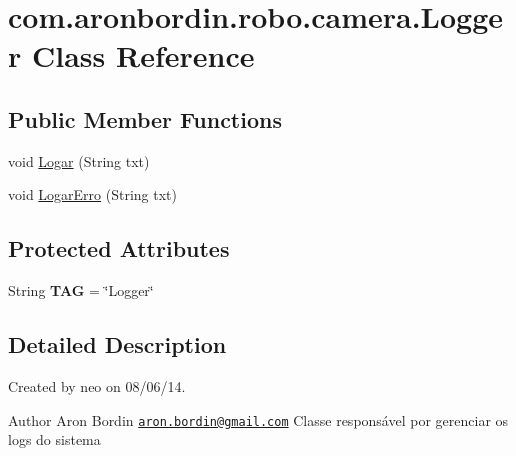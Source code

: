 \hypertarget{classcom_1_1aronbordin_1_1robo_1_1camera_1_1Logger}{\section{com.\+aronbordin.\+robo.\+camera.\+Logger Class Reference}
\label{classcom_1_1aronbordin_1_1robo_1_1camera_1_1Logger}
}
\subsection*{Public Member Functions}
\begin{DoxyCompactItemize}
\item 
void \hyperlink{classcom_1_1aronbordin_1_1robo_1_1camera_1_1Logger_a2eaaf2648c5a95b0ccf221703f4bd97e}{Logar} (String txt)
\item 
void \hyperlink{classcom_1_1aronbordin_1_1robo_1_1camera_1_1Logger_a774dc21499208a63a88b219a76be6e0c}{Logar\+Erro} (String txt)
\end{DoxyCompactItemize}
\subsection*{Protected Attributes}
\begin{DoxyCompactItemize}
\item 
\hypertarget{classcom_1_1aronbordin_1_1robo_1_1camera_1_1Logger_ae1d3ae02ba0a8d6fa91042a5e03bcc4e}{String {\bfseries T\+A\+G} = \char`\"{}Logger\char`\"{}}\label{classcom_1_1aronbordin_1_1robo_1_1camera_1_1Logger_ae1d3ae02ba0a8d6fa91042a5e03bcc4e}

\end{DoxyCompactItemize}


\subsection{Detailed Description}
Created by neo on 08/06/14. \begin{DoxyAuthor}{Author}
Aron Bordin \href{mailto:aron.bordin@gmail.com}{\tt aron.\+bordin@gmail.\+com} Classe responsável por gerenciar os logs do sistema 
\end{DoxyAuthor}


